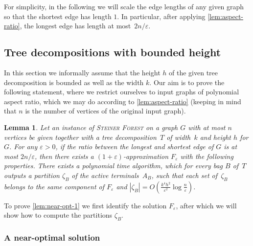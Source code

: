 \documentclass[a4paper]{article}
\theoremstyle{plain}
\newtheorem{lemma}[theorem]{Lemma}%
\newcommand{\eps}{{\varepsilon}}
\newcommand{\pname}[1]{\textsc{#1}}
\newcommand{\SF}{\pname{Steiner Forest}\xspace}
\begin{document}
For simplicity, in the following we will scale the edge lengths of any given graph so that the shortest edge has length $1$.
In particular, after applying \autoref{lem:aspect-ratio}, the longest edge has length at most~$2n/\eps$.

\subsection{Tree decompositions with bounded height}\label{sec:tw-height}

In this section we informally assume that the height $h$ of the given tree
decomposition is bounded as well as the width $k$. 
%
Our aim is to prove the following statement, where we restrict ourselves to input graphs of polynomial aspect ratio, which we may do according to \autoref{lem:aspect-ratio} (keeping in mind that $n$ is the number of vertices of the original input graph).

\begin{lemma}\label{lem:near-opt-1} 
Let an instance of \SF on a graph $G$ with at most $n$ vertices 
be given together with a tree decomposition~$T$ of
width~$k$ and height $h$ for $G$. For any $\eps>0$, if the ratio between the
longest and shortest edge of $G$ is at most $2n/\eps$, then there exists a
$(1+\eps)$-approximation $F_\eps$ with the following properties. There exists a
polynomial time algorithm, which for every bag $B$ of~$T$ outputs a partition
$\zeta_B$ of the active terminals~$A_B$, such that each set of~$\zeta_B$
belongs to the same component of $F_\eps$ and
$|\zeta_B|=O(\frac{k^4h^2}{\eps^2}\log\frac{n}{\eps})$.  
\end{lemma}

%
%

To prove \autoref{lem:near-opt-1} we first identify the solution $F_\eps$, after which we will show how to compute the partitions $\zeta_B$.

\subsubsection{A near-optimal solution}
\end{document}
